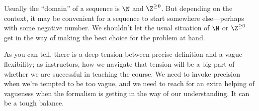 \documentclass{ximera}
\begin{document}
\begin{warning}
  Usually the ``domain'' of a sequence is $\N$ and $\Z^{\ge 0}$.  But
  depending on the context, it may be convenient for a sequence to
  start somewhere else---perhaps with some negative number.  We
  shouldn't let the usual situation of $\N$ or $\Z^{\ge 0}$ get in the
  way of making the best choice for the problem at hand.
\end{warning}

As you can tell, there is a deep tension between precise definition
and a vague flexibility; as instructors, how we navigate that tension
will be a big part of whether we are successful in teaching the
course.  We need to invoke precision when we're tempted to be too
vague, and we need to reach for an extra helping of vagueness when the
formalism is getting in the way of our understanding.  It can be a
tough balance.
\end{document}
